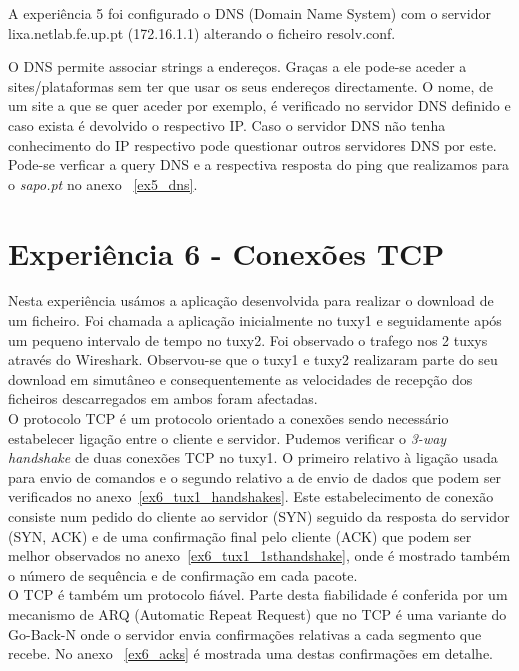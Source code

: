 \documentclass[11pt,a4paper,reqno]{report}
\numberwithin{equation}{section}
\begin{document}
A experiência 5 foi configurado o DNS (Domain Name System) com o servidor lixa.netlab.fe.up.pt (172.16.1.1) alterando o ficheiro resolv.conf.

O DNS permite associar strings a endereços. Graças a ele pode-se aceder a sites/plataformas sem ter que usar os seus endereços directamente. O nome, de um site a que se quer aceder por exemplo, é verificado no servidor DNS definido e caso exista é devolvido o respectivo IP. Caso o servidor DNS não tenha conhecimento do IP respectivo pode questionar outros servidores DNS por este. \\

Pode-se verficar a query DNS e a respectiva resposta do ping que realizamos para o \emph{sapo.pt} no anexo ~\ref{ex5_dns}.\\


\section{Experiência 6 - Conexões TCP}

Nesta experiência usámos a aplicação desenvolvida para realizar o download de um ficheiro. Foi chamada a aplicação inicialmente no tuxy1 e seguidamente após um pequeno intervalo de tempo no tuxy2. Foi observado o trafego nos 2 tuxys através do Wireshark. Observou-se que o tuxy1 e tuxy2 realizaram parte do seu download em simutâneo e consequentemente as velocidades de recepção dos ficheiros descarregados em ambos foram afectadas.\\

O protocolo TCP é um protocolo orientado a conexões sendo necessário estabelecer ligação entre o cliente e servidor.
Pudemos verificar o \emph{3-way handshake} de duas conexões TCP no tuxy1. O primeiro relativo à ligação usada para envio de comandos e o segundo relativo a de envio de dados que podem ser verificados no anexo~\ref{ex6_tux1_handshakes}. Este estabelecimento de conexão consiste num pedido do cliente ao servidor (SYN) seguido da resposta do servidor (SYN, ACK) e de uma confirmação final pelo cliente (ACK) que podem ser melhor observados no anexo~\ref{ex6_tux1_1sthandshake}, onde é mostrado também o número de sequência e de confirmação em cada pacote. \\

O TCP é também um protocolo fiável. Parte desta fiabilidade é conferida por um mecanismo de ARQ (Automatic Repeat Request) que no TCP é uma variante do Go-Back-N onde o servidor envia confirmações relativas a cada segmento que recebe. No anexo ~\ref{ex6_acks} é mostrada uma destas confirmações em detalhe. \\
\end{document}

